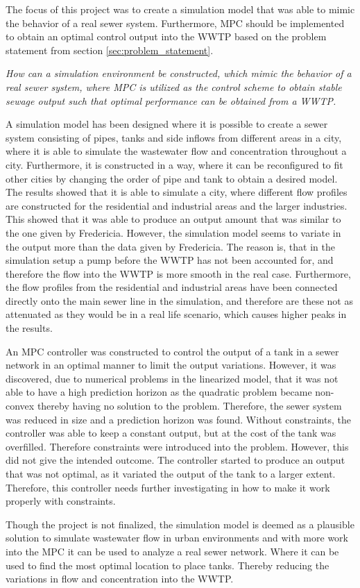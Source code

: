 The focus of this project was to create a simulation model that was able to mimic the behavior of a real sewer system. Furthermore, MPC should be implemented to obtain an optimal control output into the WWTP based on the problem statement from section \ref{sec:problem_statement}. 

\begin{center}
\textit{How can a simulation environment be constructed, which mimic the behavior of a real sewer system, where MPC is utilized as the control scheme to obtain stable sewage output such that optimal performance can be obtained from a WWTP.}
\end{center}

A simulation model has been designed where it is possible to create a sewer system consisting of pipes, tanks and side inflows from different areas in a city, where it is able to simulate the wastewater flow and concentration throughout a city. Furthermore, it is constructed in a way, where it can be reconfigured to fit other cities by changing the order of pipe and tank to obtain a desired model. The results showed that it is able to simulate a city, where different flow profiles are constructed for the residential and industrial areas and the larger industries. This showed that it was able to produce an output amount that was similar to the one given by Fredericia. However, the simulation model seems to variate in the output more than the data given by Fredericia. The reason is, that in the simulation setup a pump before the WWTP has not been accounted for, and therefore the flow into the WWTP is more smooth in the real case. Furthermore, the flow profiles from the residential and industrial areas have been connected directly onto the main sewer line in the simulation, and therefore are these not as attenuated as they would be in a real life scenario, which causes higher peaks in the results.      

An MPC controller was constructed to control the output of a tank in a sewer network in an optimal manner to limit the output variations. However, it was discovered, due to numerical problems in the linearized model, that it was not able to have a high prediction horizon as the quadratic problem became non-convex thereby having no solution to the problem. Therefore, the sewer system was reduced in size and a prediction horizon was found. Without constraints, the controller was able to keep a constant output, but at the cost of the tank was overfilled. Therefore constraints were introduced into the problem. However, this did not give the intended outcome. The controller started to produce an output that was not optimal, as it variated the output of the tank to a larger extent. Therefore, this controller needs further investigating in how to make it work properly with constraints.        

Though the project is not finalized, the simulation model is deemed as a plausible solution to simulate wastewater flow in urban environments and with more work into the MPC it can be used to analyze a real sewer network. Where it can be used to find the most optimal location to place tanks. Thereby reducing the variations in flow and concentration into the WWTP.  



